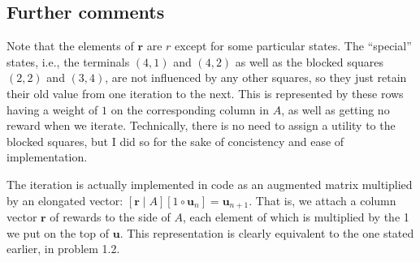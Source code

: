 \documentclass[letterpaper, 10pt]{article}
\begin{document}

\subsection{Further comments} 
\label{ssec:furthercomments}
Note that the elements of $\mathbf{r}$ are $r$ except for some particular states.
The ``special'' states, i.e., the terminals $(4, 1)$ and $(4, 2)$ as well as the blocked squares $(2,2)$ and $(3, 4)$, are not influenced by any other squares, so they just retain their old value from one iteration to the next. 
This is represented by these rows having a weight of $1$ on the corresponding column in $A$, as well as getting no reward when we iterate. 
Technically, there is no need to assign a utility to the blocked squares, but I did so for the sake of concistency and ease of implementation.

The iteration is actually implemented in code as an augmented matrix multiplied by an elongated vector: 
$[\mathbf{r} \mid \! A] [1 \circ \mathbf{u}_n] = \mathbf{u}_{n+1}$. 
That is, we attach a column vector $\mathbf{r}$ of rewards to the side of $A$, each element of which is multiplied by the 1 we put on the top of $\mathbf{u}$.
This representation is clearly equivalent to the one stated earlier, in problem 1.2.
\end{document}
